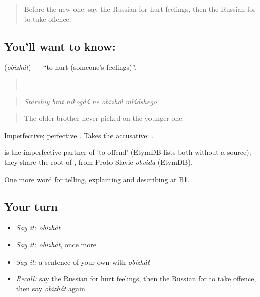 \label{lesson:RU-C471-obizhat}



\begin{quote}
Before the new one: say the Russian for hurt feelings, then the Russian for to take offence.
\end{quote}

\subsection*{You'll want to know: }
\textbf{} (\emph{obizhát}) — \textquotedblleft{}to hurt (someone's feelings)\textquotedblright{}.

\begin{quote}
     .
\end{quote}

\begin{quote}
\emph{Stárshiy brat nikogdá ne obizhál mládshego.}
\end{quote}

\begin{quote}
The older brother never picked on the younger one.
\end{quote}

Imperfective; perfective . Takes the accusative: \emph{ }.

\begin{cousinweb}
\emph{} is the imperfective partner of \emph{} 'to offend' (EtymDB lists both without a source); they share the root of \emph{}, from Proto-Slavic \emph{obvida} (EtymDB).
\end{cousinweb}

\begin{grammarlens}[title={What you've built}]
One more word for telling, explaining and describing at B1.
\end{grammarlens}

\subsection*{Your turn}
\begin{itemize}
\raggedright
  \item \emph{Say it:} \emph{obizhát}
  \item \emph{Say it:} \emph{obizhát}, once more
  \item \emph{Say it:} a sentence of your own with \emph{obizhát}
  \item \emph{Recall:} say the Russian for hurt feelings, then the Russian for to take offence, then say \emph{obizhát} again
\end{itemize}

